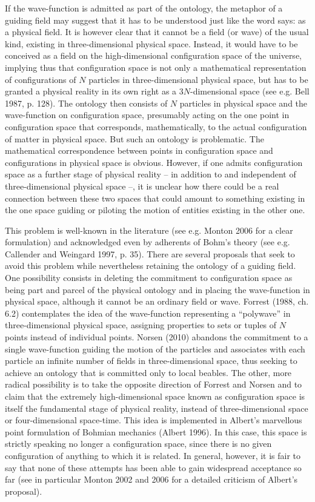 \documentclass[12pt,a4paper]{article}
\theoremstyle{definition}
\begin{document}
If the wave-function is admitted as part of the ontology, the metaphor of a guiding field may suggest that it has to be understood just like the word says: as a physical field. It is however clear that it cannot be a field (or wave) of the usual kind, existing in three-dimensional physical space. Instead, it would have to be conceived as a field on the high-dimensional configuration space of the universe, implying thus that configuration space is not only a mathematical representation of configurations of $N$ particles in three-dimensional physical space, but has to be granted a physical reality in its own right as a $3N$-dimensional space (see e.g. Bell 1987, p. 128). The ontology then consists of $N$ particles in physical space and the wave-function on configuration space, presumably acting on the one point in configuration space that corresponds, mathematically, to the actual configuration of matter in physical space. But such an ontology is problematic. The mathematical correspondence between points in configuration space and configurations in physical space is obvious. However, if one admits configuration space as a further stage of physical reality -- in addition to and independent of three-dimensional physical space --, it is unclear how there could be a real connection between these two spaces that could amount to something existing in the one space guiding or piloting the motion of entities existing in the other one.

This problem is well-known in the literature (see e.g. Monton 2006 for a clear formulation) and acknowledged even by adherents of Bohm's theory (see e.g. Callender and Weingard 1997, p. 35). There are several proposals that seek to avoid this problem while nevertheless retaining the ontology of a guiding field. One possibility consists in deleting the commitment to configuration space as being part and parcel of the physical ontology and in placing the wave-function in physical space, although it cannot be an ordinary field or wave. Forrest (1988, ch. 6.2) contemplates the idea of the wave-function representing a ``polywave'' in three-dimensional physical space, assigning properties to sets or tuples of $N$ points instead of individual points. Norsen (2010) abandons the commitment to a single wave-function guiding the motion of the particles and associates with each particle an infinite number of fields in three-dimensional space, thus seeking to achieve an ontology that is committed only to local beables. The other, more radical possibility is to take the opposite direction of Forrest and Norsen and to claim that the extremely high-dimensional space known as configuration space is itself the fundamental stage of physical reality, instead of three-dimensional space or four-dimensional space-time. This idea is implemented in Albert's marvellous point formulation of Bohmian mechanics (Albert 1996). In this case, this space is strictly speaking no longer a configuration space, since there is no given configuration of anything to which it is related. In general, however, it is fair to say that none of these attempts has been able to gain widespread acceptance so far (see in particular Monton 2002 and 2006 for a detailed criticism of Albert's proposal).
\end{document}

